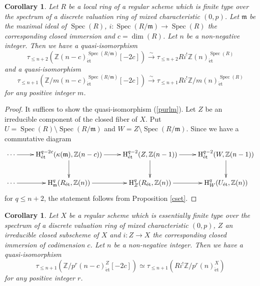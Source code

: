 \documentclass{article}
\newtheorem{cor}[thm]{\indent \sc Corollary}
\newcommand{\spec}{\operatorname{Spec}}
\newcommand{\et}{\mathrm{\acute{e}t}}
\newcommand{\HO}{\operatorname{H}}
\begin{document}
\begin{cor}\upshape\label{PurC}
Let $R$ be a local ring of a regular scheme which is finite type 
over the spectrum of a discrete valuation ring of mixed characteristic
$(0, p)$. Let $\mathfrak{m}$ be the maximal ideal of $\spec(R)$,
$i: \spec(R/\mathfrak{m})\to \spec(R)$ the corresponding closed immersion
and $c=\operatorname{dim}(R)$.
Let $n$ be a non-negative integer. 
Then we have a quasi-isomorphism
%
\begin{equation}\label{purlm}
\tau_{\leq n+2}\left(
\mathbb{Z}(n-c)_{\et}^{\spec(R/\mathfrak{m})}[-2c]
\right)
\xrightarrow{\sim}
\tau_{\leq n+2}
Ri^{!}\mathbb{Z}(n)_{\et}^{\spec(R)}
\end{equation}
%
and a quasi-isomorphism
%
\begin{equation*}
\tau_{\leq n+1}\left(
\mathbb{Z}/m(n-c)_{\et}^{\spec(R/\mathfrak{m})}[-2c]
\right)
\xrightarrow{\sim}
\tau_{\leq n+1}
Ri^{!}\mathbb{Z}/m(n)_{\et}^{\spec(R)}
\end{equation*}
%
for any positive integer $m$.
\end{cor}
%

%
\begin{proof}\upshape
It suffices to show the quasi-isomorphism (\ref{purlm}).  
Let $Z$ be an irreducible component of the closed fiber of $X$. 
Put $U=\spec(R)\setminus\spec(R/\mathfrak{m})$
and $W=Z\setminus\spec(R/\mathfrak{m})$. 
Since we have a commutative diagram
%
\small
\begin{equation*}
\xymatrix{
\cdots\ar[r]
&
\HO^{q-2c}_{\et}(
\kappa(\mathfrak{m}),
\mathbb{Z}(n-c)
)
\ar[r]\ar[d]
&
\HO^{q-2}_{\et}(
Z,
\mathbb{Z}(n-1)
)
\ar[r]\ar[d]
&
\HO^{q-2}_{\et}(
W,
\mathbb{Z}(n-1)
) \ar[d]
\\
\cdots
\ar[r]
&
\HO^{q}_{\mathfrak{m}}(
R_{\et},
\mathbb{Z}(n)
)
\ar[r]
&
\HO^{q}_{Z}(
R_{\et},
\mathbb{Z}(n)
)\ar[r]
&
\HO^{q}_{W}(
U_{\et},
\mathbb{Z}(n)
)
}    
\end{equation*}
%
\normalsize
for $q\leq n+2$, the statement follows from Proposition \ref{cset}.
\end{proof}
%

%
\begin{cor}\upshape
Let $X$ be a regular scheme 
which is
essentially finite type over the
spectrum of a discrete valuation ring of mixed characteristic 
$(0, p)$,
$Z$ an irreducible closed subscheme of $X$
and $i: Z\to X$ the corresponding closed immersion of codimension $c$.
Let $n$ be a non-negative integer.
Then we have a quasi-isomorphism
%
\begin{equation*}
\tau_{\leq n+1}\left(
\mathbb{Z}/p^{r}(n-c)^{Z}_{\et}[-2c]
\right)
\simeq
\tau_{\leq n+1}\left(
Ri^{!}\mathbb{Z}/p^{r}(n)^{X}_{\et}
\right)
\end{equation*}
%
for any positive integer $r$.
\end{cor}
%
\end{document}
